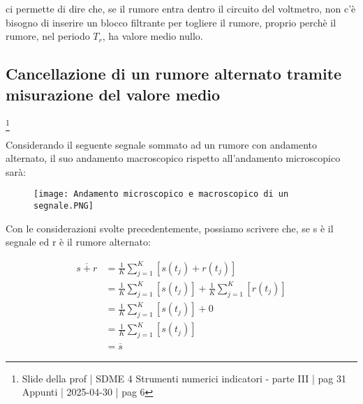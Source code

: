 ci permette di dire che, se il rumore entra dentro il circuito del voltmetro, 
non c'è bisogno di inserire un blocco filtrante per togliere il rumore, 
proprio perchè il rumore, nel periodo $T_r$, ha valore medio nullo. \newline 

\newpage 

\subsection{Cancellazione di un rumore alternato tramite misurazione del valore medio}
\footnote{Slide della prof | SDME 4 Strumenti numerici indicatori - parte III | pag  31 \\  
Appunti | 2025-04-30 | pag 6} 

Considerando il seguente segnale sommato ad un rumore con andamento alternato, il suo andamento macroscopico rispetto all'andamento microscopico sarà: 

\begin{figure}[h]
    \centering
    \texttt{[image: Andamento microscopico e macroscopico di un segnale.PNG]}
\end{figure} 

Con le considerazioni svolte precedentemente, possiamo scrivere che, se s è il segnale ed r è il rumore alternato: 

{
    \Large 
    \begin{equation}
        \begin{split}
            \overline{s + r} 
            &=
            \frac{1}{K}
            \sum_{j = 1}^{K}
            \left[ 
                s (t_j) + r(t_j)
            \right] 
            \\
            &= 
            \frac{1}{K}
            \sum_{j = 1}^{K}
            \left[ 
                s (t_j) 
            \right] 
            + 
            \frac{1}{K}
            \sum_{j = 1}^{K}
            \left[
            r(t_j)
            \right]
            \\
            &= 
            \frac{1}{K}
            \sum_{j = 1}^{K}
            \left[ 
                s (t_j) 
            \right] 
            + 
            0
            \\ 
            &= 
            \frac{1}{K}
            \sum_{j = 1}^{K}
            \left[ 
                s (t_j) 
            \right] 
            \\ 
            &= 
            \overline{s}
        \end{split}
    \end{equation}
}


